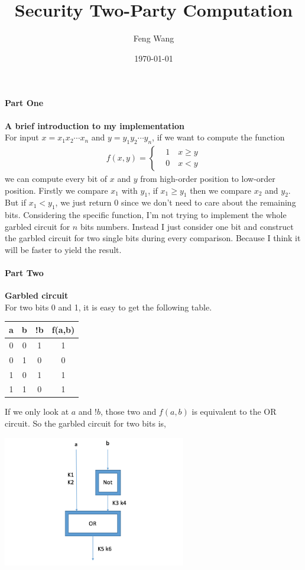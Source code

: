 \documentclass[11pt]{article}
\title{Security Two-Party Computation}
\date{\today}
\author{Feng Wang}
\begin{document}
\maketitle
\paragraph{Part One}{\textbf{A brief introduction to my implementation}}\vspace{2ex}\\
For input $x = x_1x_2\cdots x_n$ and $y= y_1y_2\cdots y_n$, if we want to compute the function 
\begin{align*}
	f(x,y) = \begin{cases}
		&1 \quad x\geq y \\
		&0 \quad x < y
	\end{cases}
\end{align*}
we can compute every bit of $x$ and $y$ from high-order position to low-order position. Firstly we compare $x_1$ with $y_1$, if $x_1 \geq y_1$ then we compare $x_2$ and $y_2$. But if $x_1 < y_1$, we just return 0 since we don't need to care about the remaining bits. Considering the specific function, I'm not trying to implement the whole garbled circuit for $n$ bits numbers. Instead I just consider one bit and construct the garbled circuit for two single bits during every comparison. Because I think it will be faster to yield the result.
\paragraph{Part Two}{\textbf{Garbled circuit}}\vspace{2ex}\\
For two bits 0 and 1, it is easy to get the following table. \\
\begin{center}
\begin{tabular}{c|c|c|c}
	\hline
	a & b & !b & f(a,b) \\
	\hline
	0 & 0 & 1 & 1 \\
	\hline
	0 & 1 & 0 & 0 \\
	\hline 
	1 & 0 & 1 & 1 \\
	\hline
	1 & 1 & 0 & 1 \\
	\hline
\end{tabular} 
\end{center}
\vspace{2ex}
If we only look at $a$ and $!b$, those two and $f(a,b)$ is equivalent to the OR circuit. So the garbled circuit for two bits is,\\
\centerline{\includegraphics[width=0.6\textwidth]{circuit}}
\end{document}
